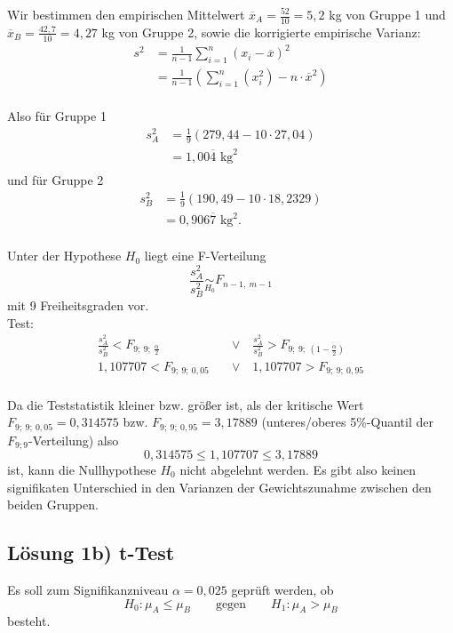 \documentclass[main.tex]{subfiles}
\begin{document}
Wir bestimmen den empirischen Mittelwert $\overline{x}_A = \frac{52}{10} = 5,2$ kg von Gruppe 1 und $\overline{x}_B = \frac{42,7}{10} = 4,27$ kg von Gruppe 2, sowie die korrigierte empirische Varianz:
$$\begin{aligned}
	s^2 &= \frac{1}{n-1} \sum_{i=1}^n (x_i - \overline{x})^2 \\
	&= \frac{1}{n-1} \left( \sum_{i=1}^n \left( x_i^2 \right) - n \cdot \overline{x}^2 \right) \\
\end{aligned}$$

Also für Gruppe 1
$$\begin{aligned}
	s_A^2 &= \frac{1}{9} \left( 279,44 - 10 \cdot 27,04 \right) \\
	&= 1,00\overline{4} \text{ kg}^2\\
\end{aligned}$$
und für Gruppe 2
$$\begin{aligned}
	s_B^2 &= \frac{1}{9} \left( 190,49 - 10 \cdot 18,2329 \right) \\
	&= 0,906\overline{7} \text{ kg}^2.\\
\end{aligned}$$

Unter der Hypothese $H_0$ liegt eine F-Verteilung
$$
	\frac{s_A^2}{s_B^2} \underset{H_0}{\sim} F_{n-1,\ m-1}
$$
mit 9 Freiheitsgraden vor.\\

Test:
$$\begin{aligned}
	\frac{s_A^2}{s_B^2} < F_{9;\ 9;\ \frac{\alpha}{2}}
	\quad &\lor \quad
	\frac{s_A^2}{s_B^2} > F_{9;\ 9;\ \left( 1 - \frac{\alpha}{2}\right)}\\
%
	1,107707 < F_{9;\ 9;\ 0,05}
	\quad &\lor \quad
	1,107707 > F_{9;\ 9;\ 0,95}\\
\end{aligned}$$

Da die Teststatistik kleiner bzw. größer ist, als der kritische Wert $F_{9;\ 9;\ 0,05} = 0,314575$ bzw. $F_{9;\ 9;\ 0,95} = 3,17889$ (unteres/oberes 5\%-Quantil der $F_{9;9}$-Verteilung) also
$$
	0,314575 \leq 1,107707 \leq 3,17889
$$
ist, kann die Nullhypothese $H_0$ nicht abgelehnt werden. Es gibt also keinen signifikaten Unterschied in den Varianzen der Gewichtszunahme zwischen den beiden Gruppen.

\subsection{Lösung 1b) t-Test}
Es soll zum Signifikanzniveau $\alpha = 0,025$ geprüft werden, ob
$$
	H_0: \mu_A \leq \mu_B \qquad \text{gegen} \qquad H_1: \mu_A > \mu_B
$$
besteht.\\
\end{document}
